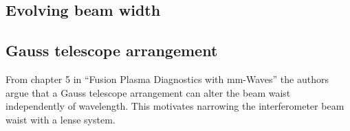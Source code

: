 \subsection{Evolving beam width}

\subsection{Gauss telescope arrangement}
From chapter 5 in ``Fusion Plasma Diagnostics with mm-Waves''\cite{PlasmaDiagnosis} the authors argue that a Gauss telescope arrangement can alter the beam waist independently of wavelength. This motivates narrowing the interferometer beam waist with a lense system.
